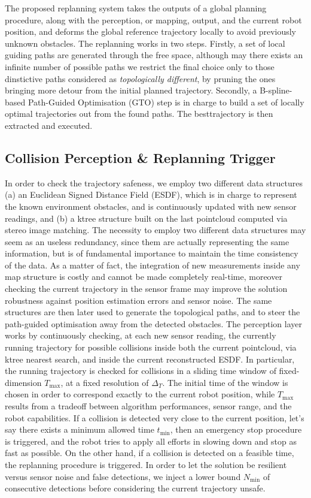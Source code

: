 The proposed replanning system takes the outputs of a global planning procedure,
along with the perception, or mapping, output, and the current robot position, and deforms the global reference trajectory locally
to avoid previously unknown obstacles. The replanning works in two steps. Firstly, a set of local guiding paths are generated through
the free space, although may there exists an infinite number of possible paths we restrict the final choice only to those dinstictive paths
considered as \emph{topologically different}, by pruning the ones bringing more detour from the initial planned trajectory.
Secondly, a B-spline-based Path-Guided Optimisation (GTO) step is in charge to build a set of locally optimal trajectories out from the
found paths. The \quotopen best\quotclosed trajectory is then extracted and executed.

\subsection{Collision Perception \& Replanning Trigger}
In order to check the trajectory safeness, we employ two different data structures (a) an Euclidean Signed Distance Field (ESDF), which
is in charge to represent the known environment obstacles, and is continuously updated with new sensor readings, and (b) a ktree structure
built on the last pointcloud computed via stereo image matching. The necessity to employ two different data structures may seem as an
useless redundancy, since them are actually representing the same information, but is of fundamental importance to maintain the time consistency of
the data. As a matter of fact, the integration of new measurements inside any map structure is costly and cannot be made completely real-time, 
moreover checking the current trajectory in the sensor frame may improve the solution robustness against position estimation errors and
sensor noise. The same structures are then later used to generate the topological paths, and to steer the path-guided optimisation away
from the detected obstacles.
The perception layer works by continuously checking, at each new sensor reading, the currently running trajectory for possible collisions
inside both the current pointcloud, via ktree nearest search, and inside the current reconstructed ESDF. In particular,
the running trajectory is checked for collisions in a sliding time window of fixed-dimension $T_{\text{max}}$, at a fixed resolution
of $\Delta_T$. The initial time of the window is chosen in order to correspond exactly to the current robot position, while $T_{\text{max}}$
results from a tradeoff between algorithm performances, sensor range, and the robot capabilities.
If a collision is detected very close to the current position, let's say there exists a minimum allowed time $t_{\text{min}}$, then an
emergency stop procedure is triggered, and the robot tries to apply all efforts in slowing down and stop as fast as possible.
On the other hand, if a collision is detected on a feasible time, the replanning procedure is triggered.
In order to let the solution be resilient versus sensor noise and false detections, we inject a lower bound $N_{\min}$ of consecutive detections
before considering the current trajectory unsafe.

